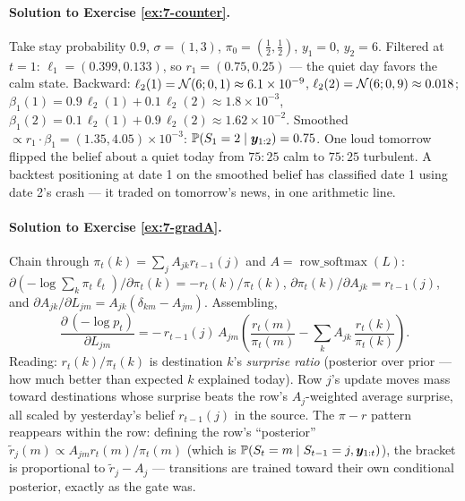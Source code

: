 \paragraph{Solution to Exercise \ref{ex:7-counter}.}
Take stay probability $0.9$, $\sigma = (1, 3)$, $\pi_0 = (\tfrac12,
\tfrac12)$, $y_1 = 0$, $y_2 = 6$. Filtered at $t = 1$:
$\ell_1 = (0.399, 0.133)$, so $r_1 = (0.75, 0.25)$ --- the quiet day
favors the calm state. Backward: $\ell_2(1) = \mathcal{N}(6; 0, 1) \approx
6.1\times 10^{-9}$, $\ell_2(2) = \mathcal{N}(6; 0, 9) \approx 0.018$;
$\beta_1(1) = 0.9\,\ell_2(1) + 0.1\,\ell_2(2) \approx 1.8\times10^{-3}$,
$\beta_1(2) = 0.1\,\ell_2(1) + 0.9\,\ell_2(2) \approx 1.62\times
10^{-2}$. Smoothed $\propto r_1 \cdot \beta_1 = (1.35, 4.05)\times
10^{-3}$: $\mathbb{P}(S_1 = 2 \mid \bm{y}_{1:2}) = 0.75$. One loud tomorrow
flipped the belief about a quiet today from $75{:}25$ calm to $75{:}25$
turbulent. A backtest positioning at date 1 on the smoothed belief has
classified date 1 using date 2's crash --- it traded on tomorrow's
news, in one arithmetic line.

\paragraph{Solution to Exercise \ref{ex:7-gradA}.}
Chain through $\pi_t(k) = \sum_j A_{jk} r_{t-1}(j)$ and $A =
\operatorname{row\_softmax}(L)$: $\partial(-\log\sum_k \pi_t \ell_t) /
\partial \pi_t(k) = -r_t(k)/\pi_t(k)$, $\partial \pi_t(k)/\partial
A_{jk} = r_{t-1}(j)$, and $\partial A_{jk}/\partial L_{jm} =
A_{jk}(\delta_{km} - A_{jm})$. Assembling,
\[
  \frac{\partial\,(-\log p_t)}{\partial L_{jm}}
  = -\,r_{t-1}(j)\, A_{jm}\!\left(\frac{r_t(m)}{\pi_t(m)}
    - \sum_k A_{jk}\, \frac{r_t(k)}{\pi_t(k)}\right).
\]
Reading: $r_t(k)/\pi_t(k)$ is destination $k$'s \emph{surprise ratio}
(posterior over prior --- how much better than expected $k$ explained
today). Row $j$'s update moves mass toward destinations whose surprise
beats the row's $A_j$-weighted average surprise, all scaled by
yesterday's belief $r_{t-1}(j)$ in the source. The $\pi - r$ pattern
reappears within the row: defining the row's ``posterior'' $\tilde
r_j(m) \propto A_{jm} r_t(m)/\pi_t(m)$ (which is $\mathbb{P}(S_t = m \mid
S_{t-1} = j, \bm{y}_{1:t})$), the bracket is proportional to $\tilde
r_j - A_j$ --- transitions are trained toward their own conditional
posterior, exactly as the gate was.

